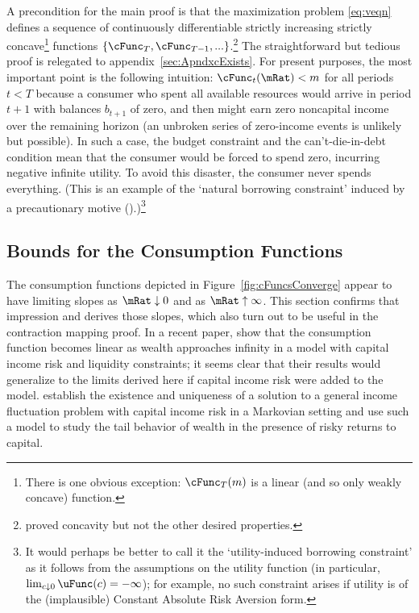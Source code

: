 \documentclass[./BufferStockTheory.tex]{subfiles}
\begin{document}
A precondition for the main proof is that the maximization problem \eqref{eq:veqn} defines a sequence of continuously differentiable strictly increasing strictly concave\footnote{There is one obvious exception: $\cFunc_{T}(m)$ is a linear (and so only weakly concave) function.} functions $\{\cFunc_{T},\cFunc_{T-1},...\}$.\footnote{\cite{ckConcavity} proved concavity but not the other desired properties.}  The straightforward but tedious proof is relegated to appendix~\ref{sec:ApndxcExists}.  For present purposes, the most important point is the following intuition: $\cFunc_{t}(\mRat) < m$ for all periods $t < T$ because a consumer who spent all available resources would arrive in period $t+1$ with balances $b_{t+1}$ of zero, and then might earn zero noncapital income over the remaining horizon (an unbroken series of zero-income events is unlikely but possible).  In such a case, the budget constraint and the can't-die-in-debt condition mean that the consumer would be forced to spend zero, incurring negative infinite utility.  To avoid this disaster, the consumer never spends everything.  (This is an example of the `natural borrowing constraint' induced by a precautionary motive (\cite{zeldesStochastic}).)\footnote{It would perhaps be better to call it the `utility-induced borrowing constraint' as it follows from the assumptions on the utility function (in particular, $\lim_{c \downarrow 0} \uFunc(c)=-\infty$); for example, no such constraint arises if utility is of the (implausible) Constant Absolute Risk Aversion form.}

\hypertarget{Bounds-for-the-Consumption-Functions}{}
\subsection{Bounds for the Consumption Functions}

The consumption functions depicted in Figure~\ref{fig:cFuncsConverge} appear
to have limiting slopes as $\mRat \downarrow 0$ and as $\mRat \uparrow
\infty$.  This section confirms that impression and derives those
slopes, which also turn out to be useful in the contraction
mapping proof.  In a recent paper, \cite{benhabibWealth} show that the consumption function
becomes linear as wealth approaches infinity in a model with capital income risk and liquidity
constraints; it seems clear that their results would generalize to the limits derived here if capital income risk were added to the model.  \cite{MaStachurskiToda2020JET} establish the existence and uniqueness of a solution to a general income fluctuation problem with capital income risk in a Markovian setting and use such a model to study the tail behavior of wealth in the presence of risky returns to capital.
\end{document}
